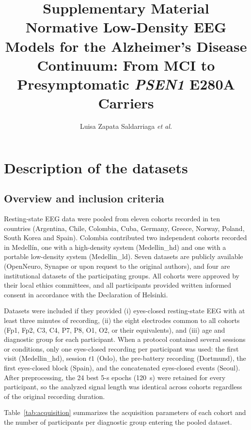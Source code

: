 \documentclass[11pt]{article}
\title{Supplementary Material\\[4pt]
\large Normative Low-Density EEG Models for the Alzheimer's Disease Continuum: From MCI to Presymptomatic \textit{PSEN1} E280A Carriers}
\author{Luisa Zapata Saldarriaga \textit{et al.}}
\date{}
\begin{document}
\maketitle

\section{Description of the datasets}

\subsection{Overview and inclusion criteria}

Resting-state EEG data were pooled from eleven cohorts recorded in ten countries (Argentina, Chile, Colombia, Cuba, Germany, Greece, Norway, Poland, South Korea and Spain). Colombia contributed two independent cohorts recorded in Medell\'in, one with a high-density system (Medellin\_hd) and one with a portable low-density system (Medellin\_ld). Seven datasets are publicly available (OpenNeuro, Synapse or upon request to the original authors), and four are institutional datasets of the participating groups. All cohorts were approved by their local ethics committees, and all participants provided written informed consent in accordance with the Declaration of Helsinki.

Datasets were included if they provided (i) eyes-closed resting-state EEG with at least three minutes of recording, (ii) the eight electrodes common to all cohorts (Fp1, Fp2, C3, C4, P7, P8, O1, O2, or their equivalents), and (iii) age and diagnostic group for each participant. When a protocol contained several sessions or conditions, only one eyes-closed recording per participant was used: the first visit (Medellin\_hd), session $t1$ (Oslo), the pre-battery recording (Dortmund), the first eyes-closed block (Spain), and the concatenated eyes-closed events (Seoul). After preprocessing, the 24 best 5-s epochs (120~s) were retained for every participant, so the analyzed signal length was identical across cohorts regardless of the original recording duration.

Table~\ref{tab:acquisition} summarizes the acquisition parameters of each cohort and the number of participants per diagnostic group entering the pooled dataset.
\end{document}
